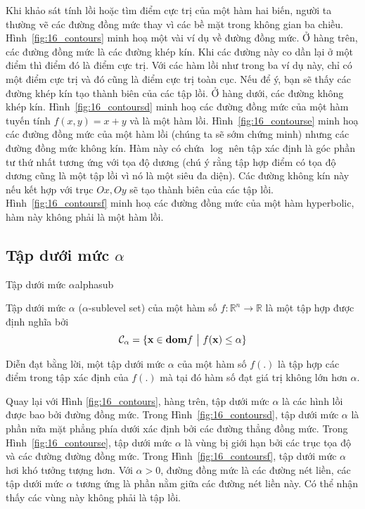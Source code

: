 Khi khảo sát tính lồi hoặc tìm điểm cực trị của một hàm hai biến,
người ta thường vẽ các đường đồng mức thay vì các bề mặt trong không gian ba chiều.
Hình~\ref{fig:16_contours} minh hoạ một vài ví dụ về đường đồng mức. Ở hàng trên,
các đường đồng mức là các đường khép kín. Khi các đường này co dần lại ở một điểm thì điểm đó là điểm cực trị. Với các hàm
lồi như trong ba ví dụ này, chỉ có một điểm cực trị và đó cũng là điểm cực trị toàn cục. Nếu để ý, bạn sẽ thấy các
đường khép kín tạo thành biên của các {tập lồi}. Ở hàng dưới, các đường
không khép kín. Hình~\ref{fig:16_contoursd} minh hoạ các đường đồng mức của một
hàm tuyến tính $f(x, y) = x + y$ và là một hàm lồi.
Hình~\ref{fig:16_contourse} minh hoạ các đường đồng mức của một hàm lồi (chúng
ta sẽ sớm chứng minh) nhưng các đường đồng mức không kín.
Hàm này có chứa $\log$ nên tập xác định là góc phần tư thứ nhất tương ứng với tọa độ dương (chú ý rằng tập hợp điểm có tọa độ dương cũng là một
{tập lồi} vì nó là một siêu đa diện). Các {đường không kín} này nếu
kết hợp với trục $Ox, Oy$ sẽ tạo thành biên của các {tập lồi}.
Hình~\ref{fig:16_contoursf} minh hoạ các đường đồng mức của một hàm hyperbolic, hàm
này không phải là một hàm lồi.
 
\subsection{Tập dưới mức $\alpha$}

\begin{mydef}{Tập dưới mức $\alpha$}{alphasub}
    
 Tập dưới mức $\alpha$ ($\alpha$-sublevel set) của một hàm số $f : \mathbb{R}^n \rightarrow
 \mathbb{R}$ là một tập hợp được định nghĩa bởi
\begin{equation*} 
\mathcal{C}_{\alpha} = \{\mathbf{x} \in \text{\bf dom} f ~\big|~ f(\mathbf{x}) \leq \alpha\} 
\end{equation*} 
\end{mydef}
Diễn đạt bằng lời, một tập dưới mức $\alpha$ của một hàm số $f(.)$ là tập hợp các
điểm trong tập xác định của $f(.)$ mà tại đó hàm số đạt giá trị không lớn hơn
$\alpha$.
 
 
Quay lại với Hình \ref{fig:16_contours}, hàng trên, tập dưới mức $\alpha$ là các hình lồi được bao bởi đường đồng mức. Trong Hình~\ref{fig:16_contoursd}, tập dưới mức $\alpha$ là phần nửa mặt phẳng phía dưới xác định bởi
các đường thẳng đồng mức. Trong Hình~\ref{fig:16_contourse}, tập dưới mức $\alpha$ là vùng bị giới hạn bởi các trục tọa độ và các đường đường đồng mức. Trong
Hình~\ref{fig:16_contoursf}, tập dưới mức $\alpha$ hơi khó tưởng tượng hơn. Với $\alpha > 0$, đường đồng mức là các đường nét liền, các tập dưới mức
$\alpha$ tương ứng là phần nằm giữa các đường nét liền này. Có thể
nhận thấy các vùng này không phải là tập lồi.

